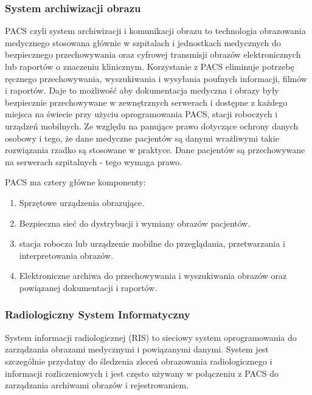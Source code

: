 \documentclass[a4paper,11pt,twoside]{report}
\theoremstyle{definition}
\begin{document}
\subsubsection{System archiwizacji obrazu}
PACS czyli system archiwizacji i komunikacji obrazu to technologia obrazowania medycznego stosowana głównie w szpitalach i jednostkach medycznych do bezpiecznego przechowywania oraz cyfrowej transmisji obrazów elektronicznych lub raportów o znaczeniu klinicznym. Korzystanie z PACS eliminuje potrzebę ręcznego przechowywania, wyszukiwania i wysyłania poufnych informacji, filmów i raportów. Daje to możliwość aby dokumentacja medyczna i obrazy były bezpiecznie przechowywane w zewnętrznych serwerach i dostępne z każdego miejsca na świecie przy użyciu oprogramowania PACS, stacji roboczych i urządzeń mobilnych. Ze względu na panujące prawo dotyczące ochrony danych osobowy i tego, że dane medyczne pacjentów są danymi wrażliwymi takie rozwiązania rzadko są stosowane w praktyce. Dane pacjentów są przechowywane na serwerach szpitalnych - tego wymaga prawo.
\par
PACS ma cztery główne komponenty: 
\begin{enumerate}
	\item Sprzętowe urządzenia obrazujące.
	\item Bezpieczna sieć do dystrybucji i wymiany obrazów pacjentów.
	\item stacja robocza lub urządzenie mobilne do przeglądania, przetwarzania i interpretowania obrazów.
	\item Elektroniczne archiwa do przechowywania i wyszukiwania obrazów oraz powiązanej dokumentacji i raportów.
\end{enumerate}

\subsubsection{Radiologiczny System Informatyczny}
System informacji radiologicznej (RIS) to sieciowy system oprogramowania do zarządzania obrazami medycznymi i powiązanymi danymi. System jest szczególnie przydatny do śledzenia zleceń obrazowania radiologicznego i informacji rozliczeniowych i jest często używany w połączeniu z PACS do zarządzania archiwami obrazów i rejestrowaniem.
\end{document}
